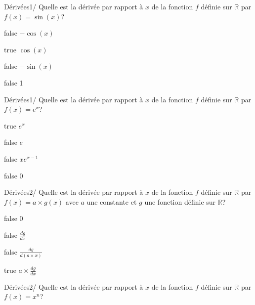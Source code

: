 \documentclass[11pt]{article}
\begin{document}
        	\begin{question}{22}{Dérivées}{1}{/}
				Quelle est la dérivée par rapport à $x$ de la fonction $f$ définie sur $\mathbb{R}$ par $f(x)=\sin(x)$?
            \end{question}

            \begin{reponses}
            	\item[false] $-\cos(x)$
            	\item[true] $\cos(x)$
                \item[false] $-\sin(x)$
                \item[false] 1
            \end{reponses}
        
        	\begin{question}{22}{Dérivées}{1}{/}
				Quelle est la dérivée par rapport à $x$ de la fonction $f$ définie sur $\mathbb{R}$ par $f(x)=e^x$?
            \end{question}

            \begin{reponses}
            	\item[true] $e^x$
            	\item[false] $e$
                \item[false] $xe^{x-1}$
                \item[false] 0
            \end{reponses}
        
        	\begin{question}{22}{Dérivées}{2}{/}
				Quelle est la dérivée par rapport à $x$ de la fonction $f$ définie sur $\mathbb{R}$ par $f(x)=a\times g(x)$ avec $a$ une constante et $g$ une fonction définie sur $\mathbb{R}$?
            \end{question}

            \begin{reponses}
            	\item[false] $0$
            	\item[false] $\frac{dg}{dx}$
                \item[false] $\frac{dg}{d(a\times x)}$
                \item[true] $a\times \frac{dg}{dx}$
            \end{reponses}
        
        	\begin{question}{22}{Dérivées}{2}{/}
				Quelle est la dérivée par rapport à $x$ de la fonction $f$ définie sur $\mathbb{R}$ par $f(x)=x^n$?
            \end{question}
\end{document}
